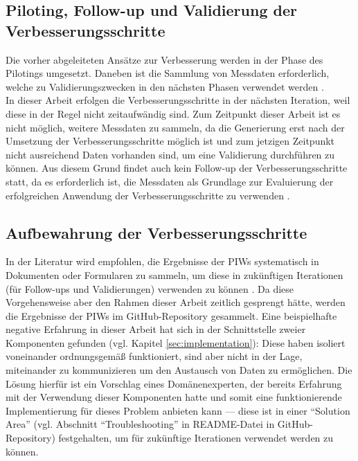 \subsection{Piloting, Follow-up und Validierung der Verbesserungsschritte}
Die vorher abgeleiteten Ansätze zur Verbesserung werden in der Phase des Pilotings umgesetzt. Daneben ist die Sammlung von Messdaten erforderlich, welche zu Validierungszwecken in den nächsten Phasen verwendet werden \cite{salo2007iterative}. \\ In dieser Arbeit erfolgen die Verbesserungsschritte in der nächsten Iteration, weil diese in der Regel nicht zeitaufwändig sind. Zum Zeitpunkt dieser Arbeit ist es nicht möglich, weitere Messdaten zu sammeln, da die Generierung erst nach der Umsetzung der Verbesserungsschritte möglich ist und zum jetzigen Zeitpunkt nicht ausreichend Daten vorhanden sind, um eine Validierung durchführen zu können. Aus diesem Grund findet auch kein Follow-up der Verbesserungsschritte statt, da es erforderlich ist, die Messdaten als Grundlage zur Evaluierung der erfolgreichen Anwendung der Verbesserungsschritte zu verwenden \cite{salo2007iterative}. 

\subsection{Aufbewahrung der Verbesserungsschritte}
In der Literatur wird empfohlen, die Ergebnisse der PIWs systematisch in Dokumenten oder Formularen zu sammeln, um diese in zukünftigen Iterationen (für Follow-ups und Validierungen) verwenden zu können \cite{salo2007iterative}. Da diese Vorgehensweise aber den Rahmen dieser Arbeit zeitlich gesprengt hätte, werden die Ergebnisse der PIWs im GitHub-Repository gesammelt. Eine beispielhafte negative Erfahrung in dieser Arbeit hat sich in der Schnittstelle zweier Komponenten gefunden (vgl. Kapitel \ref{sec:implementation}): Diese haben isoliert voneinander ordnungsgemäß funktioniert, sind aber nicht in der Lage, miteinander zu kommunizieren um den Austausch von Daten zu ermöglichen. Die Lösung hierfür ist ein Vorschlag eines Domänenexperten, der bereits Erfahrung mit der Verwendung dieser Komponenten hatte und somit eine funktionierende Implementierung für dieses Problem anbieten kann --- diese ist in einer \enquote{Solution Area} (vgl. Abschnitt \enquote{Troubleshooting} in README-Datei in GitHub-Repository) festgehalten, um für zukünftige Iterationen verwendet werden zu können.

